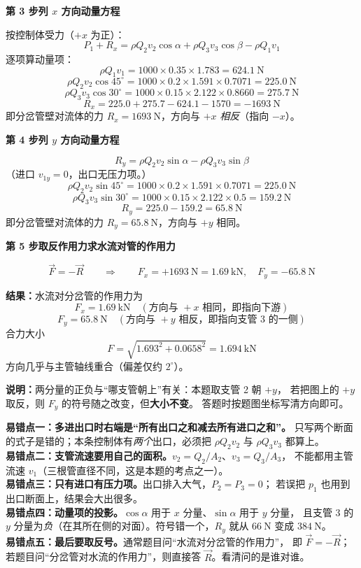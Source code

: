 \begin{jie}
\textbf{第 3 步\quad 列 $x$ 方向动量方程}

按控制体受力（$+x$ 为正）：
\[ P_1+R_x=\rho Q_2v_2\cos\alpha+\rho Q_3v_3\cos\beta-\rho Q_1v_1 \]
逐项算动量项：
\[ \rho Q_1v_1=1000\times0.35\times1.783=624.1\ \mathrm{N} \]
\[ \rho Q_2v_2\cos45^\circ=1000\times0.2\times1.591\times0.7071=225.0\ \mathrm{N} \]
\[ \rho Q_3v_3\cos30^\circ=1000\times0.15\times2.122\times0.8660=275.7\ \mathrm{N} \]
\[ R_x=225.0+275.7-624.1-1570=-1693\ \mathrm{N} \]
即分岔管壁对流体的力 $R_x=1693\ \mathrm{N}$，方向与 $+x$ \emph{相反}（指向 $-x$）。

\textbf{第 4 步\quad 列 $y$ 方向动量方程}

\[ R_y=\rho Q_2v_2\sin\alpha-\rho Q_3v_3\sin\beta \]
（进口 $v_{1y}=0$，出口无压力项。）
\[ \rho Q_2v_2\sin45^\circ=1000\times0.2\times1.591\times0.7071=225.0\ \mathrm{N} \]
\[ \rho Q_3v_3\sin30^\circ=1000\times0.15\times2.122\times0.5=159.2\ \mathrm{N} \]
\[ R_y=225.0-159.2=65.8\ \mathrm{N} \]
即分岔管壁对流体的力 $R_y=65.8\ \mathrm{N}$，方向与 $+y$ 相同。

\textbf{第 5 步\quad 取反作用力求水流对管的作用力}

\[ \vec F=-\vec R\qquad\Longrightarrow\qquad F_x=+1693\ \mathrm{N}=1.69\ \mathrm{kN},\quad F_y=-65.8\ \mathrm{N} \]

\textbf{结果：}水流对分岔管的作用力为
\[ F_x=1.69\ \mathrm{kN}\quad(\text{方向与 }+x\text{ 相同，即指向下游}) \]
\[ F_y=65.8\ \mathrm{N}\quad(\text{方向与 }+y\text{ 相反，即指向支管 3 的一侧}) \]
合力大小
\[ F=\sqrt{1.693^2+0.0658^2}=1.694\ \mathrm{kN} \]
方向几乎与主管轴线重合（偏差仅约 $2^\circ$）。

\textbf{说明：}两分量的正负与“哪支管朝上”有关：本题取支管 2 朝 $+y$，
若把图上的 $+y$ 取反，则 $F_y$ 的符号随之改变，但\textbf{大小不变}。
答题时按题图坐标写清方向即可。
\end{jie}

\begin{yicuo}
\textbf{易错点一：多进出口时右端是“所有出口之和减去所有进口之和”。}
只写两个断面的式子是错的；本条控制体有\emph{两个}出口，必须把 $\rho Q_2v_2$ 与 $\rho Q_3v_3$ 都算上。\\
\textbf{易错点二：支管流速要用自己的面积。}$v_2=Q_2/A_2$、$v_3=Q_3/A_3$，
不能都用主管流速 $v_1$（三根管直径不同，这是本题的考点之一）。\\
\textbf{易错点三：只有进口有压力项。}出口排入大气，$P_2=P_3=0$；
若误把 $p_1$ 也用到出口断面上，结果会大出很多。\\
\textbf{易错点四：动量项的投影。}$\cos\alpha$ 用于 $x$ 分量、$\sin\alpha$ 用于 $y$ 分量，
且支管 3 的 $y$ 分量为\emph{负}（在其所在侧的对面）。符号错一个，$R_y$ 就从 $66\ \mathrm{N}$ 变成 $384\ \mathrm{N}$。\\
\textbf{易错点五：最后要取反号。}通常题目问“水流对分岔管的作用力”，
即 $\vec F=-\vec R$；若题目问“分岔管对水流的作用力”，则直接答 $\vec R$。看清问的是谁对谁。
\end{yicuo}

